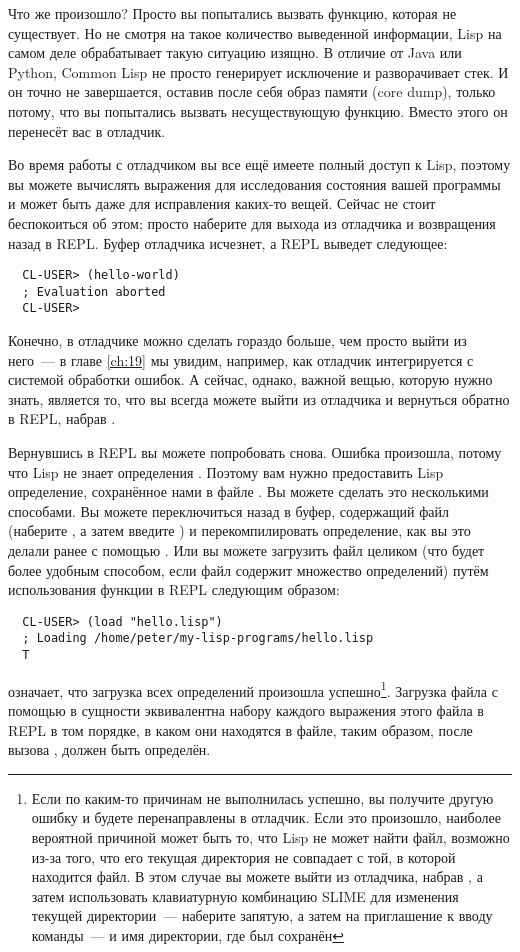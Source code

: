 Что же произошло? Просто вы попытались вызвать функцию, которая не существует. Но не
смотря на такое количество выведенной информации, Lisp на самом деле обрабатывает такую
ситуацию изящно. В отличие от Java или Python, Common Lisp не просто генерирует исключение
и разворачивает стек. И он точно не завершается, оставив после себя образ памяти (core
dump), только потому, что вы попытались вызвать несуществующую функцию. Вместо этого он
перенесёт вас в отладчик.

Во время работы с отладчиком вы все ещё имеете полный доступ к Lisp, поэтому вы можете
вычислять выражения для исследования состояния вашей программы и может быть даже для
исправления каких-то вещей. Сейчас не стоит беспокоиться об этом; просто наберите  для
выхода из отладчика и возвращения назад в REPL. Буфер отладчика исчезнет, а REPL выведет
следующее:

\begin{verbatim}
  CL-USER> (hello-world) 
  ; Evaluation aborted
  CL-USER>
\end{verbatim}

Конечно, в отладчике можно сделать гораздо больше, чем просто выйти из него~--- в главе
\ref{ch:19} мы увидим, например, как отладчик интегрируется с системой обработки ошибок.
А сейчас, однако, важной вещью, которую нужно знать, является то, что вы всегда можете
выйти из отладчика и вернуться обратно в REPL, набрав .

Вернувшись в REPL вы можете попробовать снова. Ошибка произошла, потому что Lisp не знает
определения . Поэтому вам нужно предоставить Lisp определение, сохранённое нами
в файле . Вы можете сделать это несколькими способами. Вы можете переключиться
назад в буфер, содержащий файл (наберите , а затем введите ) и
перекомпилировать определение, как вы это делали ранее с помощью . Или вы можете
загрузить файл целиком (что будет более удобным способом, если файл содержит множество
определений) путём использования функции  в REPL следующим образом:

\begin{verbatim}
  CL-USER> (load "hello.lisp")
  ; Loading /home/peter/my-lisp-programs/hello.lisp
  T
\end{verbatim}

 означает, что загрузка всех определений произошла успешно\footnote{Если по каким-то
  причинам  не выполнилась успешно, вы получите другую ошибку и будете перенаправлены
  в отладчик. Если это произошло, наиболее вероятной причиной может быть то, что Lisp не
  может найти файл, возможно из-за того, что его текущая директория не совпадает с той, в
  которой находится файл. В этом случае вы можете выйти из отладчика, набрав , а затем
  использовать клавиатурную комбинацию SLIME  для изменения текущей директории~---
  наберите запятую, а затем на приглашение к вводу команды~---  и имя директории, где был
  сохранён }. Загрузка файла с помощью  в сущности эквивалентна набору
каждого выражения этого файла в REPL в том порядке, в каком они находятся в файле, таким
образом, после вызова ,  должен быть определён.

